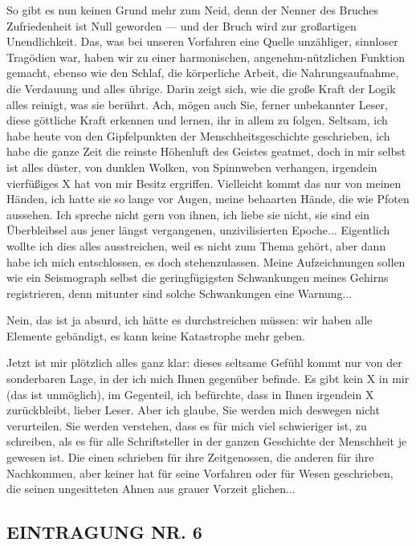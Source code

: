 So gibt es nun keinen Grund mehr zum Neid, denn der Nenner des
Bruches Zufriedenheit ist Null geworden — und der Bruch wird zur
großartigen Unendlichkeit. Das, was bei unseren Vorfahren eine
Quelle unzähliger, sinnloser Tragödien war, haben wir zu einer
harmonischen, angenehm-nützlichen Funktion gemacht, ebenso wie den
Schlaf, die körperliche Arbeit, die Nahrungsaufnahme, die Verdauung
und alles übrige. Darin zeigt sich, wie die große Kraft der Logik
alles reinigt, was sie berührt. Ach, mögen auch Sie, ferner
unbekannter Leser, diese göttliche Kraft erkennen und lernen, ihr
in allem zu folgen. Seltsam, ich habe heute von den Gipfelpunkten
der Menschheitsgeschichte geschrieben, ich habe die ganze Zeit die
reinste Höhenluft des Geistes geatmet, doch in mir selbst ist alles
düster, von dunklen Wolken, von Spinnweben verhangen, irgendein
vierfüßiges X hat von mir Besitz ergriffen. Vielleicht kommt das
nur von meinen Händen, ich hatte sie so lange vor Augen, meine
behaarten Hände, die wie Pfoten aussehen. Ich spreche nicht gern
von ihnen, ich liebe sie nicht, sie sind ein Überbleibsel aus jener
längst vergangenen, unzivilisierten Epoche... Eigentlich wollte ich
dies alles ausstreichen, weil es nicht zum Thema gehört, aber dann
habe ich mich entschlossen, es doch stehenzulassen. Meine
Aufzeichnungen sollen wie ein Seismograph selbst die
geringfügigsten Schwankungen meines Gehirns registrieren, denn
mitunter sind solche Schwankungen eine Warnung...

Nein, das ist ja absurd, ich hätte es durchstreichen müssen: wir
haben alle Elemente gebändigt, es kann keine Katastrophe mehr
geben.

Jetzt ist mir plötzlich alles ganz klar: dieses seltsame Gefühl
kommt nur von der sonderbaren Lage, in der ich mich Ihnen gegenüber
befinde. Es gibt kein X in mir (das ist unmöglich), im Gegenteil,
ich befürchte, dass in Ihnen irgendein X zurückbleibt, lieber
Leser. Aber ich glaube, Sie werden mich deswegen nicht verurteilen.
Sie werden verstehen, dass es für mich viel schwieriger ist, zu
schreiben, als es für alle Schriftsteller in der ganzen Geschichte
der Menschheit je gewesen ist. Die einen schrieben für ihre
Zeitgenossen, die anderen für ihre Nachkommen, aber keiner hat für
seine Vorfahren oder für Wesen geschrieben, die seinen ungesitteten
Ahnen aus grauer Vorzeit glichen...

\subsection{EINTRAGUNG NR. 6}

